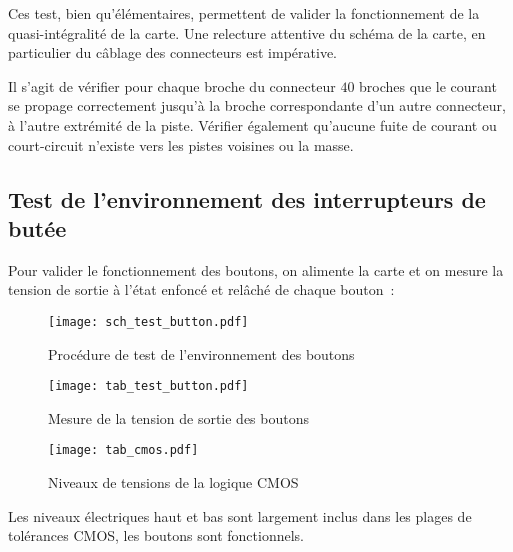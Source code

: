 Ces test, bien qu'élémentaires, permettent de valider la fonctionnement de la quasi-intégralité de la carte. Une relecture attentive du schéma de la carte, en particulier du câblage des connecteurs est impérative.

\vspace{1cm}

Il s'agit de vérifier pour chaque broche du connecteur $40$ broches que le courant se propage correctement jusqu'à la broche correspondante d'un autre connecteur, à l'autre extrémité de la piste. Vérifier également qu'aucune fuite de courant ou court-circuit n'existe vers les pistes voisines ou la masse.

\subsection{Test de l'environnement des interrupteurs de butée}

Pour valider le fonctionnement des boutons, on alimente la carte et on mesure la tension de sortie à l'état enfoncé et relâché de chaque bouton~:

\begin{figure}[H]
    \centering
    \texttt{[image: sch\_test\_button.pdf]}
    \decoRule
    \caption[
    Procédure de test de l'environnement des boutons]{
    Procédure de test de l'environnement des boutons}
    \label{fig:Procédure de test de l'environnement des boutons}
	\end{figure}

\begin{figure}[H]
    \centering
	\texttt{[image: tab\_test\_button.pdf]}
    \decoRule
    \caption[
    Mesure de la tension de sortie des boutons]{
    Mesure de la tension de sortie des boutons}
    \label{fig:Mesure de la tension de sortie des boutons}
	\end{figure}


\begin{figure}[H]
    \centering
	\texttt{[image: tab\_cmos.pdf]}
    \decoRule
    \caption[
    Niveaux de tensions de la logique CMOS]{
    Niveaux de tensions de la logique CMOS}
    \label{fig:Niveaux de tensions de la logique CMOS}
	\end{figure}

\vspace{1cm}

Les niveaux électriques haut et bas sont largement inclus dans les plages de tolérances CMOS, les boutons sont fonctionnels.

